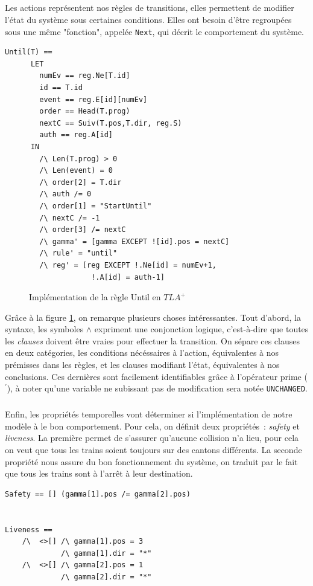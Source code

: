 \documentclass[oneside, a4paper, 11pt]{book}
\newcommand{\TLA}{\ensuremath{TLA^+~}}
\begin{document}
\subparagraph{} Les actions représentent nos règles de transitions, elles permettent de modifier l'état du système sous certaines conditions. Elles ont besoin d'être regroupées sous une même "fonction", appelée \texttt{Next}, qui décrit le comportement du système.

\begin{verbatim}
Until(T) == 
	  LET
	  	numEv == reg.Ne[T.id]
	  	id == T.id
	  	event == reg.E[id][numEv]
	  	order == Head(T.prog)
	  	nextC == Suiv(T.pos,T.dir, reg.S)
	  	auth == reg.A[id]
	  IN
	  	/\ Len(T.prog) > 0
	  	/\ Len(event) = 0
	  	/\ order[2] = T.dir 
	  	/\ auth /= 0
	  	/\ order[1] = "StartUntil"
	  	/\ nextC /= -1
	  	/\ order[3] /= nextC
	  	/\ gamma' = [gamma EXCEPT ![id].pos = nextC]
	  	/\ rule' = "until"
	  	/\ reg' = [reg EXCEPT !.Ne[id] = numEv+1,
	  				!.A[id] = auth-1]
\end{verbatim}

\begin{figure}[h]
	\caption{Implémentation de la règle Until en \TLA}
	\label{fig:untilTLA}
\end{figure}

Grâce à la figure \ref{fig:untilTLA}, on remarque plusieurs choses intéressantes. Tout d'abord, la syntaxe, les symboles $\wedge$ expriment une conjonction logique, c'est-à-dire que toutes les \textit{clauses} doivent être vraies pour effectuer la transition.
On sépare ces clauses en deux catégories, les conditions nécéssaires à l'action, équivalentes à nos prémisses dans les règles, et les clauses modifiant l'état, équivalentes à nos conclusions. Ces dernières sont facilement identifiables grâce à l'opérateur prime ($^\prime$), à noter qu'une variable ne subissant pas de modification sera notée \texttt{UNCHANGED}.

\subparagraph{} Enfin, les propriétés temporelles vont déterminer si l'implémentation de notre modèle à le bon comportement. Pour cela, on définit deux propriétés~: \textit{safety} et \textit{liveness}.
La première permet de s'assurer qu'aucune collision n'a lieu, pour cela on veut que tous les trains soient toujours sur des cantons différents. La seconde propriété nous assure du bon fonctionnement du système, on traduit par le fait que tous les trains sont à l'arrêt à leur destination.


\begin{verbatim}
Safety == [] (gamma[1].pos /= gamma[2].pos)


Liveness == 
    /\  <>[] /\ gamma[1].pos = 3
             /\ gamma[1].dir = "*"
    /\  <>[] /\ gamma[2].pos = 1
             /\ gamma[2].dir = "*"
\end{verbatim}
\end{document}
